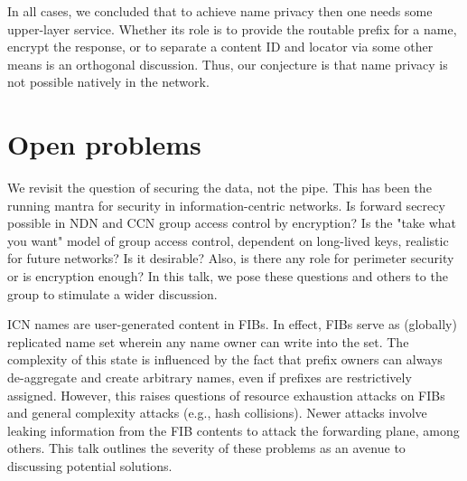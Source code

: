 \documentclass[a4paper,UKenglish]{dagrep}
\begin{document}
In all cases, we concluded that to achieve name privacy then one needs some upper-layer service. Whether its role is to provide the routable prefix for a name, encrypt the response, or to separate a content ID and locator via some other means is an orthogonal discussion. Thus, our conjecture is that name privacy is not possible natively in the network.





\section{Open problems}

\license

We revisit the question of securing the data, not the pipe. This has been the running mantra for security in information-centric networks. Is forward secrecy possible in NDN and CCN group access control by encryption? Is the "take what you want" model of group access control, dependent on long-lived keys, realistic for future networks? Is it desirable? Also, is there any role for perimeter security or is encryption enough? In this talk, we pose these questions and others to the group to stimulate a wider discussion.

\license

ICN names are user-generated content in FIBs. In effect, FIBs serve as (globally) replicated name set wherein any name owner can write into the set. The complexity of this state is influenced by the fact that prefix owners can always de-aggregate and create arbitrary names, even if prefixes are restrictively assigned. However, this raises questions of resource exhaustion attacks on FIBs and general complexity attacks (e.g., hash collisions). Newer attacks involve leaking information from the FIB contents to attack the forwarding plane, among others. This talk outlines the severity of these problems as an avenue to discussing potential solutions.
\end{document}
